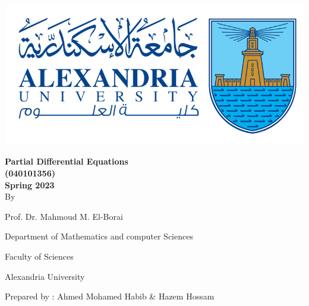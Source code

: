 \begingroup
\thispagestyle{empty}
\begin{center}
    \includegraphics[scale=.5]{collage logo.png}
    \vspace*{1.5cm}
    \par
    {\fontsize{20pt}{30pt}\selectfont
    \textbf{Partial Differential Equations\\(040101356)\\Spring 2023}
    \\
    \vspace*{.75cm}
    By
    \vspace*{.75cm}
    
    Prof. Dr. Mahmoud M. El-Borai
    
    Department of Mathematics and computer Sciences
    
    Faculty of Sciences
    
    Alexandria University
    }

    \vspace*{\fill}
    {\fontsize{10pt}{10pt}\selectfont
    Prepared by : Ahmed Mohamed Habib \& Hazem Hossam
    }
\end{center}

\restoregeometry
\endgroup
\newpage
\thispagestyle{empty}
\tableofcontents

\newpage
\setcounter{page}{1}